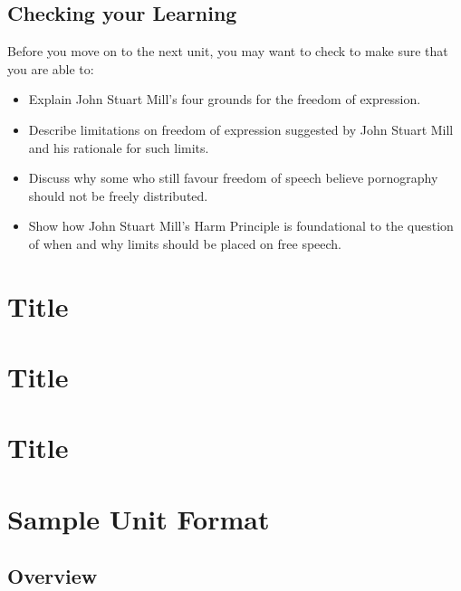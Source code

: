 \documentclass[
]{book}
\providecommand{\tightlist}{%
  \setlength{\itemsep}{0pt}\setlength{\parskip}{0pt}}
\begin{document}
\hypertarget{checking-your-learning-2}{%
\section*{Checking your Learning}\label{checking-your-learning-2}}

\begin{progress}
Before you move on to the next unit, you may want to check to make sure that you are able to:

\begin{itemize}
\tightlist
\item
  Explain John Stuart Mill's four grounds for the freedom of expression.
\item
  Describe limitations on freedom of expression suggested by John Stuart Mill and his rationale for such limits.
\item
  Discuss why some who still favour freedom of speech believe pornography should not be freely distributed.
\item
  Show how John Stuart Mill's Harm Principle is foundational to the question of when and why limits should be placed on free speech.
\end{itemize}
\end{progress}

\hypertarget{title}{%
\chapter{Title}\label{title}}

\hypertarget{title-1}{%
\chapter{Title}\label{title-1}}

\hypertarget{title-2}{%
\chapter{Title}\label{title-2}}

\hypertarget{sample-unit-format}{%
\chapter{Sample Unit Format}\label{sample-unit-format}}

\hypertarget{overview-3}{%
\section*{Overview}\label{overview-3}}
\end{document}
